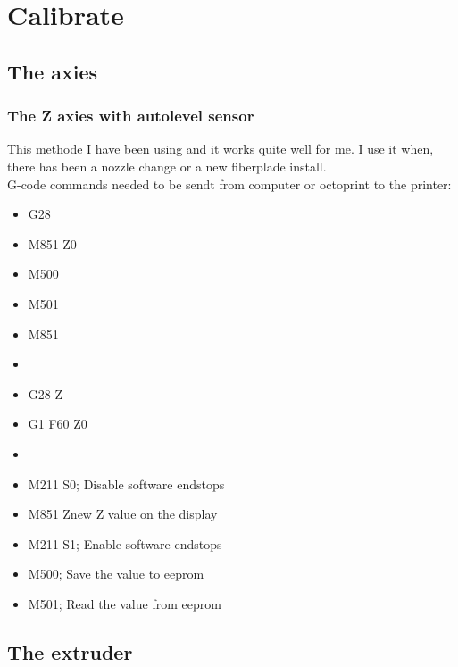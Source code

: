 \section{Calibrate}

\subsection{The axies}

\subsubsection{The Z axies with autolevel sensor}
This methode I have been using and it works quite well for me. 
I use it when, there has been a nozzle change or a new fiberplade install. \\
G-code commands needed to be sendt from computer or octoprint to the printer:
\begin{itemize}
    \item G28
    \item M851 Z0
    \item M500
    \item M501
    \item M851
    \item {}
    \item G28 Z
    \item G1 F60 Z0
    \item {}
    \item M211 S0; Disable software endstops
    \item M851 Z{new Z value on the display}
    \item M211 S1; Enable software endstops
    \item M500; Save the value to eeprom
    \item M501; Read the value from eeprom
\end{itemize}



\subsection{The extruder}
